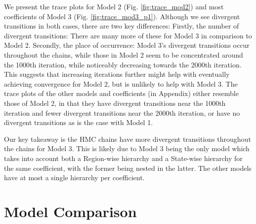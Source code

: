\documentclass[12pt]{article}
\newcommand{\red}[1]{\textcolor{red}{#1}}
\newcommand{\blue}[1]{\textcolor{blue}{#1}}
\begin{document}

We present the trace plots for Model 2 (Fig. \ref{fig:trace_mod2}) and most coefficients of Model 3 (Fig. \ref{fig:trace_mod3_p1}). Although we see divergent transitions in both cases, there are two key differences:
Firstly, the number of divergent transitions: There are many more of these for Model 3 in comparison to Model 2. Secondly, the place of occurrence: Model 3's divergent transitions occur throughout the chains, while those in Model 2 seem to be concentrated around the 1000th iteration, while noticeably decreasing towards the 2000th iteration. This suggests that increasing iterations further might help with eventually achieving convergence for Model 2, but is unlikely to help with Model 3.
The trace plots of the other models and coefficients (in Appendix) either resemble those of Model 2, in that they have divergent transitions near the 1000th iteration and fewer divergent transitions near the 2000th iteration, 
or have no divergent transitions as is the case with Model 1.

Our key takeaway is the HMC chains have more divergent transitions throughout the chains for Model 3.
This is likely due to Model 3 being the only model which takes into account both a Region-wise hierarchy and a State-wise hierarchy for the same coefficient, with the former being nested in the latter. The other models have at most a single hierarchy per coefficient. 



\section{Model Comparison} \label{sec:comparison}
\end{document}
